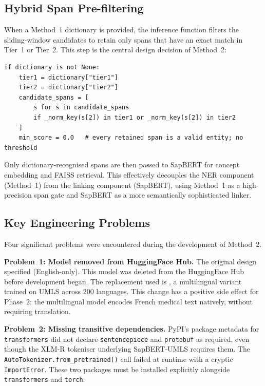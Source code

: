 \subsection{Hybrid Span Pre-filtering}

When a Method~1 dictionary is provided, the inference function filters the sliding-window candidates to retain only spans that have an exact match in Tier~1 or Tier~2. This step is the central design decision of Method~2:

\begin{verbatim}
if dictionary is not None:
    tier1 = dictionary["tier1"]
    tier2 = dictionary["tier2"]
    candidate_spans = [
        s for s in candidate_spans
        if _norm_key(s[2]) in tier1 or _norm_key(s[2]) in tier2
    ]
    min_score = 0.0   # every retained span is a valid entity; no threshold
\end{verbatim}

Only dictionary-recognised spans are then passed to SapBERT for concept embedding and FAISS retrieval. This effectively decouples the NER component (Method~1) from the linking component (SapBERT), using Method~1 as a high-precision span gate and SapBERT as a more semantically sophisticated linker.

\subsection{Key Engineering Problems}
\label{sec:m2-problems}

Four significant problems were encountered during the development of Method~2.

\begin{sloppypar}
\textbf{Problem~1: Model removed from HuggingFace Hub.} The original design specified  (English-only). This model was deleted from the HuggingFace Hub before development began. The replacement used is , a multilingual variant trained on UMLS across 200 languages. This change has a positive side effect for Phase~2: the multilingual model encodes French medical text natively, without requiring translation.
\end{sloppypar}

\textbf{Problem~2: Missing transitive dependencies.} PyPI's package metadata for \texttt{transformers} did not declare \texttt{sentencepiece} and \texttt{protobuf} as required, even though the XLM-R tokeniser underlying SapBERT-UMLS requires them. The \texttt{AutoTokenizer.from\_pretrained()} call failed at runtime with a cryptic \texttt{ImportError}. These two packages must be installed explicitly alongside \texttt{transformers} and \texttt{torch}.

